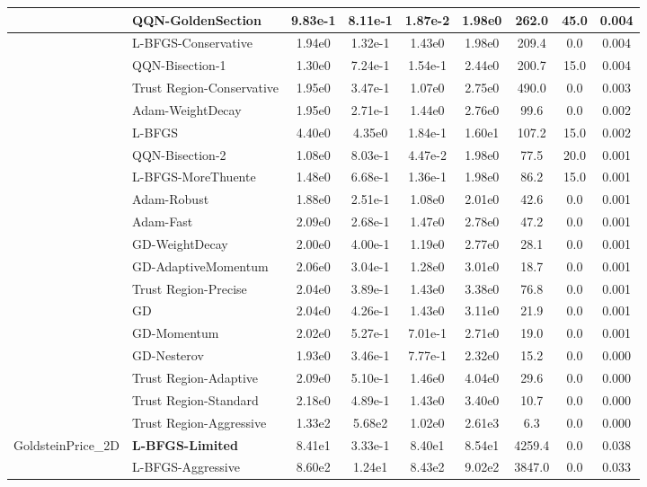 \documentclass{article}
\begin{document}
\begin{longtable}{|l|l|c|c|c|c|c|c|c|}
\hline
 & QQN-GoldenSection & 9.83e-1 & 8.11e-1 & 1.87e-2 & 1.98e0 & 262.0 & 45.0 & 0.004 \\
\hline
 & L-BFGS-Conservative & 1.94e0 & 1.32e-1 & 1.43e0 & 1.98e0 & 209.4 & 0.0 & 0.004 \\
\hline
 & QQN-Bisection-1 & 1.30e0 & 7.24e-1 & 1.54e-1 & 2.44e0 & 200.7 & 15.0 & 0.004 \\
\hline
 & Trust Region-Conservative & 1.95e0 & 3.47e-1 & 1.07e0 & 2.75e0 & 490.0 & 0.0 & 0.003 \\
\hline
 & Adam-WeightDecay & 1.95e0 & 2.71e-1 & 1.44e0 & 2.76e0 & 99.6 & 0.0 & 0.002 \\
\hline
 & L-BFGS & 4.40e0 & 4.35e0 & 1.84e-1 & 1.60e1 & 107.2 & 15.0 & 0.002 \\
\hline
 & QQN-Bisection-2 & 1.08e0 & 8.03e-1 & 4.47e-2 & 1.98e0 & 77.5 & 20.0 & 0.001 \\
\hline
 & L-BFGS-MoreThuente & 1.48e0 & 6.68e-1 & 1.36e-1 & 1.98e0 & 86.2 & 15.0 & 0.001 \\
\hline
 & Adam-Robust & 1.88e0 & 2.51e-1 & 1.08e0 & 2.01e0 & 42.6 & 0.0 & 0.001 \\
\hline
 & Adam-Fast & 2.09e0 & 2.68e-1 & 1.47e0 & 2.78e0 & 47.2 & 0.0 & 0.001 \\
\hline
 & GD-WeightDecay & 2.00e0 & 4.00e-1 & 1.19e0 & 2.77e0 & 28.1 & 0.0 & 0.001 \\
\hline
 & GD-AdaptiveMomentum & 2.06e0 & 3.04e-1 & 1.28e0 & 3.01e0 & 18.7 & 0.0 & 0.001 \\
\hline
 & Trust Region-Precise & 2.04e0 & 3.89e-1 & 1.43e0 & 3.38e0 & 76.8 & 0.0 & 0.001 \\
\hline
 & GD & 2.04e0 & 4.26e-1 & 1.43e0 & 3.11e0 & 21.9 & 0.0 & 0.001 \\
\hline
 & GD-Momentum & 2.02e0 & 5.27e-1 & 7.01e-1 & 2.71e0 & 19.0 & 0.0 & 0.001 \\
\hline
 & GD-Nesterov & 1.93e0 & 3.46e-1 & 7.77e-1 & 2.32e0 & 15.2 & 0.0 & 0.000 \\
\hline
 & Trust Region-Adaptive & 2.09e0 & 5.10e-1 & 1.46e0 & 4.04e0 & 29.6 & 0.0 & 0.000 \\
\hline
 & Trust Region-Standard & 2.18e0 & 4.89e-1 & 1.43e0 & 3.40e0 & 10.7 & 0.0 & 0.000 \\
\hline
 & Trust Region-Aggressive & 1.33e2 & 5.68e2 & 1.02e0 & 2.61e3 & 6.3 & 0.0 & 0.000 \\
GoldsteinPrice\_2D & \textbf{L-BFGS-Limited} & 8.41e1 & 3.33e-1 & 8.40e1 & 8.54e1 & 4259.4 & 0.0 & 0.038 \\
\hline
 & L-BFGS-Aggressive & 8.60e2 & 1.24e1 & 8.43e2 & 9.02e2 & 3847.0 & 0.0 & 0.033 \\

\end{longtable}
\end{document}
